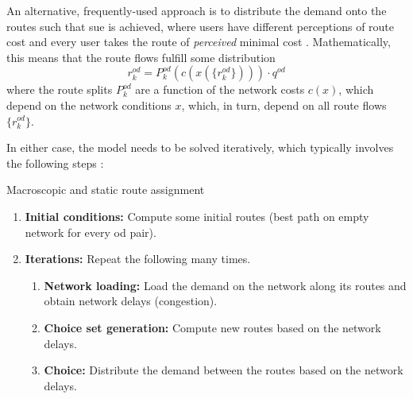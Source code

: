 An alternative, frequently-used approach is to distribute the demand onto
the routes such that  \gls{sue} is
achieved, where users have different perceptions of route cost and
every user takes the route of \emph{perceived} minimal cost \citep{DaganzoSheffi_TransScience_1977}.
Mathematically, this means that the route flows fulfill some distribution
\begin{equation}
r^{od}_k = P^{od}_k(c(x(\{r^{od}_k\}))) \cdot q^{od}
\label{stoch-equil}
\end{equation}
where the route splits $P^{od}_k$ are a function of the network costs
$c(x)$, which depend on the network conditions $x$,
which, in turn, depend on all route flows $\{r^{od}_k\}$.

In either case, the model needs to be solved iteratively, 
which typically involves the following steps \citep{Sheffi_1985}:

\begin{algorithm}[H]
\label{static-macro-routes}

\caption{Macroscopic and static route assignment}

\begin{enumerate}

\item \textbf{Initial conditions:} Compute some initial routes
  (\eg best path on empty network for every \gls{od} pair).

\item \textbf{Iterations:} Repeat the following many times.

\begin{enumerate}

\item \textbf{Network loading:} Load the demand on the network along
  its routes and obtain network delays (congestion).

\item \textbf{Choice set generation:} Compute new routes based on the
  network delays.

\item \textbf{Choice:} Distribute the demand between the routes based
  on the network delays.

\end{enumerate} %

\end{enumerate}

\end{algorithm}

